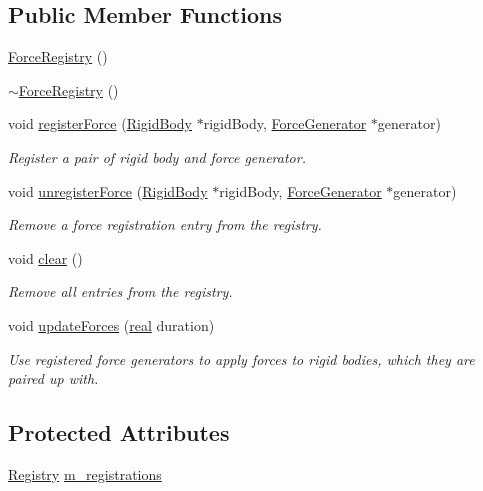 \subsection*{Public Member Functions}
\begin{DoxyCompactItemize}
\item 
\mbox{\hyperlink{classr3_1_1_force_registry_a6830132c53a756ebf3e6621195f51b17}{Force\+Registry}} ()
\item 
\mbox{\hyperlink{classr3_1_1_force_registry_a322cdf54468a6f59610562a7bfc2e60d}{$\sim$\+Force\+Registry}} ()
\item 
void \mbox{\hyperlink{classr3_1_1_force_registry_a18e3bee47d4510cc91426103042b382c}{register\+Force}} (\mbox{\hyperlink{classr3_1_1_rigid_body}{Rigid\+Body}} $\ast$rigid\+Body, \mbox{\hyperlink{classr3_1_1_force_generator}{Force\+Generator}} $\ast$generator)
\begin{DoxyCompactList}\small\item\em Register a pair of rigid body and force generator. \end{DoxyCompactList}\item 
void \mbox{\hyperlink{classr3_1_1_force_registry_a8fcc46a35435ffb74c471a0a5ff36a7f}{unregister\+Force}} (\mbox{\hyperlink{classr3_1_1_rigid_body}{Rigid\+Body}} $\ast$rigid\+Body, \mbox{\hyperlink{classr3_1_1_force_generator}{Force\+Generator}} $\ast$generator)
\begin{DoxyCompactList}\small\item\em Remove a force registration entry from the registry. \end{DoxyCompactList}\item 
void \mbox{\hyperlink{classr3_1_1_force_registry_ab1c31bc403d998af16df97ff5d42c95f}{clear}} ()
\begin{DoxyCompactList}\small\item\em Remove all entries from the registry. \end{DoxyCompactList}\item 
void \mbox{\hyperlink{classr3_1_1_force_registry_a34d6ad7472e2f47dfd3416a703eca78e}{update\+Forces}} (\mbox{\hyperlink{namespacer3_ab2016b3e3f743fb735afce242f0dc1eb}{real}} duration)
\begin{DoxyCompactList}\small\item\em Use registered force generators to apply forces to rigid bodies, which they are paired up with. \end{DoxyCompactList}\end{DoxyCompactItemize}
\subsection*{Protected Attributes}
\begin{DoxyCompactItemize}
\item 
\mbox{\hyperlink{classr3_1_1_force_registry_a91449a71b1a33d773ef787ae56ae9b2d}{Registry}} \mbox{\hyperlink{classr3_1_1_force_registry_a36847da26301dc4b18e6b6b25fb2fa51}{m\+\_\+registrations}}
\end{DoxyCompactItemize}


